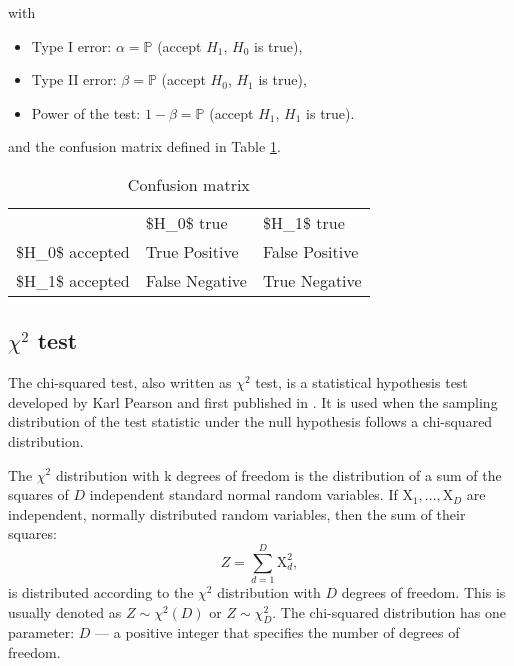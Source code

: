 \documentclass[]{book}
\begin{document}
with

\begin{itemize}
\item
  Type I error: \(\alpha = \mathbb{P}\) (accept \(H_1\), \(H_0\) is true),
\item
  Type II error: \(\beta = \mathbb{P}\) (accept \(H_0\), \(H_1\) is true),
\item
  Power of the test: \(1 - \beta = \mathbb{P}\) (accept \(H_1\), \(H_1\) is true).
\end{itemize}

and the confusion matrix defined in Table \ref{tab:confusion}.

\begin{table}

\caption{\label{tab:confusion}Confusion matrix}
\centering
\begin{tabular}[t]{lll}
\toprule
 & \$H\_0\$ true & \$H\_1\$ true\\
\$H\_0\$ accepted & True Positive & False Positive\\
\$H\_1\$ accepted & False Negative & True Negative\\
\bottomrule
\end{tabular}
\end{table}

\hypertarget{chi2}{%
\subsection{\texorpdfstring{\(\chi^2\) test}{\textbackslash{}chi\^{}2 test}}\label{chi2}}

The chi-squared test, also written as \(\chi^2\) test, is a statistical
hypothesis test developed by Karl Pearson and first published in
\citep{pearson1900on}. It is used when the sampling distribution of the test
statistic under the null hypothesis follows a chi-squared distribution.

The \(\chi^2\) distribution with k degrees of freedom is the distribution
of a sum of the squares of \(D\) independent standard normal random
variables. If \(\mathrm{X}_1, ..., \mathrm{X}_D\) are independent, normally distributed
random variables, then the sum of their squares:
\[Z =\sum _{d=1}^{D} \mathrm{X}_d^2,\] is distributed according to the \(\chi^2\)
distribution with \(D\) degrees of freedom. This is usually denoted as
\(Z \sim \chi^{2}(D)\) or \(Z \sim \chi_D^2\). The chi-squared distribution
has one parameter: \(D\) --- a positive integer that specifies the number of
degrees of freedom.
\end{document}
